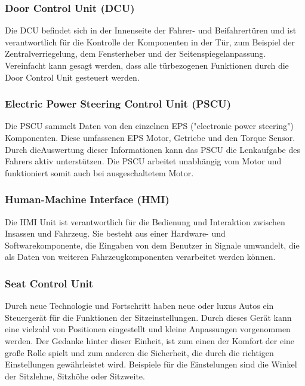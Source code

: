         \subsubsection{Door Control Unit (DCU)}
        Die DCU befindet sich in der Innenseite der Fahrer- und Beifahrertüren und ist verantwortlich für die
        Kontrolle der Komponenten in der Tür, zum Beispiel der Zentralverriegelung, dem Fensterheber und der Seitenspiegelanpassung. 
        Vereinfacht kann gesagt werden, dass alle türbezogenen Funktionen durch die Door Control Unit gesteuert werden.
        ~\cite{doorcontrol.PB1} ~\cite{doorcontrol.PB2}

        \subsubsection{Electric Power Steering Control Unit (PSCU)}
        Die PSCU sammelt Daten von den einzelnen EPS ("electronic power steering") Komponenten. Diese umfassenen EPS Motor,
        Getriebe und den Torque Sensor.\\ Durch dieAuswertung dieser Informationen kann das PSCU die Lenkaufgabe des
        Fahrers aktiv unterstützen. Die PSCU arbeitet unabhängig vom Motor und funktioniert somit auch bei ausgeschaltetem Motor.
        ~\cite{PSCU.PB1}

        \subsubsection{Human-Machine Interface (HMI)}
        Die HMI Unit ist verantwortlich für die Bedienung und Interaktion zwischen Insassen und Fahrzeug. Sie besteht aus einer
        Hardware- und Softwarekomponente, die Eingaben von dem Benutzer in Signale umwandelt, die als Daten von weiteren Fahrzeugkomponenten
        verarbeitet werden können.
        ~\cite{HMI.PB1} ~\cite{HMI.PB2}

        \subsubsection{Seat Control Unit}
        Durch neue Technologie und Fortschritt haben neue oder luxus Autos ein Steuergerät für die Funktionen der Sitzeinstellungen.
        Durch dieses Gerät kann eine vielzahl von Positionen eingestellt und kleine Anpassungen vorgenommen werden.
        Der Gedanke hinter dieser Einheit, ist zum einen der Komfort der eine große Rolle spielt und zum anderen die Sicherheit,
        die durch die richtigen Einstellungen gewährleistet wird. Beispiele für die Einstelungen sind die Winkel der Sitzlehne,
        Sitzhöhe oder Sitzweite.
        ~\cite{seatcontrol.PB1} ~\cite{seatcontrol.PB2} 

